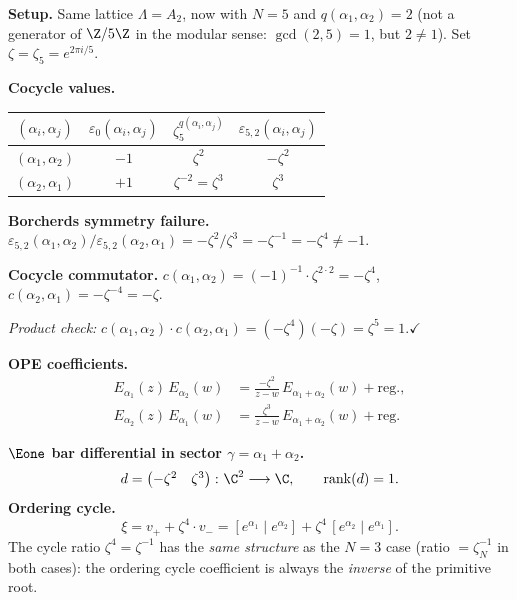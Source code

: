 \begin{computation}[\texorpdfstring{$A_2$}{A_2} with non-standard parameter: \texorpdfstring{$N = 5$}{N = 5}, \texorpdfstring{$q = 2$}{q = 2}]
\label{comp:lattice:a2-n5-q2}

\noindent\textbf{Setup.}
Same lattice $\Lambda = A_2$, now with $N = 5$ and
$q(\alpha_1,\alpha_2) = 2$ (not a generator of $\Z/5\Z$
in the modular sense: $\gcd(2,5) = 1$, but $2 \neq 1$).
Set $\zeta = \zeta_5 = e^{2\pi i/5}$.
\smallskip

\noindent\textbf{Cocycle values.}
\begin{center}
\renewcommand{\arraystretch}{1.3}
\begin{tabular}{c c c c}
$(\alpha_i,\alpha_j)$
 & $\varepsilon_0(\alpha_i,\alpha_j)$
 & $\zeta_5^{q(\alpha_i,\alpha_j)}$
 & $\varepsilon_{5,2}(\alpha_i,\alpha_j)$ \\
\hline
$(\alpha_1,\alpha_2)$
 & $-1$ & $\zeta^2$ & $-\zeta^2$ \\
$(\alpha_2,\alpha_1)$
 & $+1$ & $\zeta^{-2} = \zeta^3$ & $\zeta^3$
\end{tabular}
\end{center}
\smallskip

\noindent\textbf{Borcherds symmetry failure.}
$\varepsilon_{5,2}(\alpha_1,\alpha_2)/\varepsilon_{5,2}(\alpha_2,\alpha_1)
= -\zeta^2/\zeta^3 = -\zeta^{-1} = -\zeta^4 \neq -1$.
\smallskip

\noindent\textbf{Cocycle commutator.}
$c(\alpha_1,\alpha_2) = (-1)^{-1} \cdot \zeta^{2 \cdot 2} = -\zeta^4$,\quad
$c(\alpha_2,\alpha_1) = -\zeta^{-4} = -\zeta$.

\noindent\emph{Product check:}
$c(\alpha_1,\alpha_2) \cdot c(\alpha_2,\alpha_1)
= (-\zeta^4)(-\zeta) = \zeta^5 = 1$.\;$\checkmark$
\smallskip

\noindent\textbf{OPE coefficients.}
\begin{align*}
E_{\alpha_1}(z)\, E_{\alpha_2}(w)
&= \frac{-\zeta^2}{z - w}\,E_{\alpha_1+\alpha_2}(w) + \mathrm{reg.}, \\
E_{\alpha_2}(z)\, E_{\alpha_1}(w)
&= \frac{\zeta^3}{z - w}\,E_{\alpha_1+\alpha_2}(w) + \mathrm{reg.}
\end{align*}
\smallskip

\noindent\textbf{$\Eone$ bar differential in sector $\gamma = \alpha_1 + \alpha_2$.}
\[
d =
\begin{pmatrix} -\zeta^2 & \zeta^3 \end{pmatrix}
\colon \C^2 \longrightarrow \C, \qquad
\operatorname{rank}(d) = 1.
\]
\textbf{Ordering cycle.}
\begin{equation}\label{eq:lattice:a2-n5-cycle}
\xi = v_+ + \zeta^4 \cdot v_-
= [e^{\alpha_1} \mid e^{\alpha_2}]
 + \zeta^4\,[e^{\alpha_2} \mid e^{\alpha_1}].
\end{equation}
The cycle ratio $\zeta^4 = \zeta^{-1}$ has the \emph{same structure}
as the $N = 3$ case (ratio $= \zeta_N^{-1}$ in both cases): the
ordering cycle coefficient is always the
\emph{inverse} of the primitive root.


\end{computation}
